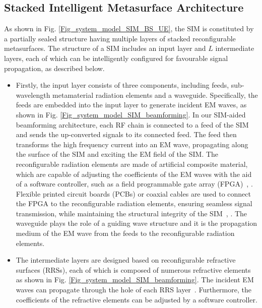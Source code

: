 \documentclass[lettersize,journal]{IEEEtran}
\theoremstyle{remark}
\begin{document}
\subsection{Stacked Intelligent Metasurface Architecture}
As shown in Fig. \ref{Fig_system_model_SIM_BS_UE}, the SIM is constituted by a partially sealed structure having multiple layers of stacked reconfigurable metasurfaces. The structure of a SIM includes an input layer and $L$ intermediate layers, each of which can be intelligently configured for favourable signal propagation, as described below.
\begin{itemize}
  \item Firstly, the input layer consists of three components, including feeds, sub-wavelength metamaterial radiation elements and a waveguide. Specifically, the feeds are embedded into the input layer to generate incident EM waves, as shown in Fig. \ref{Fig_system_model_SIM_beamforming}. In our SIM-aided beamforming architecture, each RF chain is connected to a feed of the SIM and sends the up-converted signals to its connected feed. The feed then transforms the high frequency current into an EM wave, propagating along the surface of the SIM and exciting the EM field of the SIM. The reconfigurable radiation elements are made of artificial composite material, which are capable of adjusting the coefficients of the EM waves with the aid of a software controller, such as a field programmable gate array (FPGA)~\cite{an2023stacked}, \cite{an2023stacked_icc}. Flexible printed circuit boards (PCBs) or coaxial cables are used to connect the FPGA to the reconfigurable radiation elements, ensuring seamless signal transmission, while maintaining the structural integrity of the SIM~\cite{xiao2024multichannel}, \cite{li2023light}. The waveguide plays the role of a guiding wave structure and it is the propagation medium of the EM wave from the feeds to the reconfigurable radiation elements.
  \item The intermediate layers are designed based on reconfigurable refractive surfaces (RRSs), each of which is composed of numerous refractive elements as shown in Fig. \ref{Fig_system_model_SIM_beamforming}. The incident EM waves can propagate through the hole of each RRS layer~\cite{liu2022programmable}. Furthermore, the coefficients of the refractive elements can be adjusted by a software controller.
\end{itemize}
\end{document}
